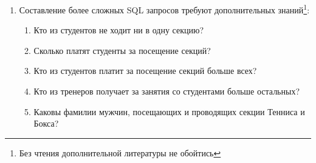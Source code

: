\begin{enumerate}
    \item Составление более сложных SQL запросов требуют дополнительных знаний\footnote{Без чтения дополнительной литературы не обойтись}:
    \begin{enumerate}
        \item Кто из студентов не ходит ни в одну секцию?
        \item Сколько платят студенты за посещение секций?
        \item Кто из студентов платит за посещение секций больше всех?
        \item Кто из тренеров получает за занятия со студентами больше остальных?
        \item Каковы фамилии мужчин, посещающих и проводящих секции Тенниса и Бокса?
    \end{enumerate}
\end{enumerate}
